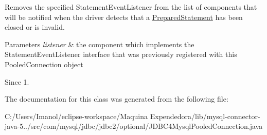 Removes the specified {\ttfamily Statement\+Event\+Listener} from the list of components that will be notified when the driver detects that a {\ttfamily \mbox{\hyperlink{classcom_1_1mysql_1_1jdbc_1_1_prepared_statement}{Prepared\+Statement}}} has been closed or is invalid.


\begin{DoxyParams}{Parameters}
{\em listener} & the component which implements the {\ttfamily Statement\+Event\+Listener} interface that was previously registered with this {\ttfamily Pooled\+Connection} object\\
\hline
\end{DoxyParams}
\begin{DoxySince}{Since}
1. 
\end{DoxySince}


The documentation for this class was generated from the following file\+:\begin{DoxyCompactItemize}
\item 
C\+:/\+Users/\+Imanol/eclipse-\/workspace/\+Maquina Expendedora/lib/mysql-\/connector-\/java-\/5../src/com/mysql/jdbc/jdbc2/optional/J\+D\+B\+C4\+Mysql\+Pooled\+Connection.\+java\end{DoxyCompactItemize}
